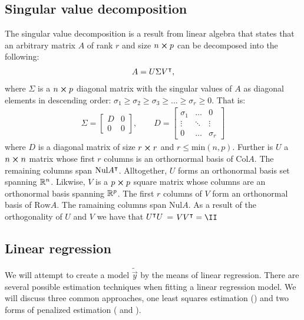 \subsection{Singular value decomposition}\label{sec:SVD}
    The singular value decomposition is a result from linear algebra that states that an arbitrary matrix $A$ of rank $r$ and size $n\cross p$ can be decomposed into the following\cite{svdecomp}:
    \begin{align}\label{eq:svd}
        A = U\Sigma V\TT,
    \end{align}
    where $\Sigma$ is a $n\cross p$ diagonal matrix with the singular values of $A$ as diagonal elements in descending order: $\sigma_1\geq\sigma_2\geq\sigma_3\geq\dots\geq\sigma_r\geq 0$. That is:
    \begin{align*}
        \Sigma = 
        \begin{bmatrix}
            D & 0 \\
            0 & 0
        \end{bmatrix},
        \quad\quad D = 
        \begin{bmatrix}
            \sigma_1 & \dots & 0 \\
            \vdots & \ddots & \vdots \\
            0 & \dots & \sigma_r
        \end{bmatrix}
    \end{align*}
    where $D$ is a diagonal matrix of size $r\cross r$ and $r\leq \text{min}(n,p)$. Further is $U$ a $n\cross n$ matrix whose first $r$ columns is an orthornormal basis of $\text{Col}A$. The remaining columns span $\text{Nul}A\TT$. Alltogether, $U$ forms an orthonormal basis set spanning $\RR[n]$. Likwise, $V$ is a $p\cross p$ square matrix whose columns are an orthonormal basis spanning $\RR[p]$. The first $r$ columns of $V$ form an orthonormal basis of $\text{Row} A$. The ramaining columns span $\text{Nul}A$. As a result of the orthogonality of $U$ and $V$ we have that $U\TT U$ = $VV\TT = \II$

\subsection{Linear regression}\label{sec:regression}
We will attempt to create a model $\tilde{\vec{y}}$ by the means of linear regression. 
There are several possible estimation techniques when fitting a linear regression model. We will discuss three common approaches, one least squares estimation () and two forms of penalized estimation ( and ).


